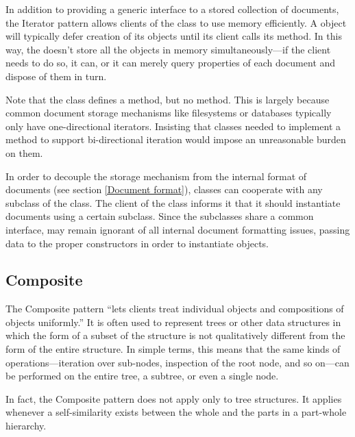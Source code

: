 In addition to providing a generic interface to a stored collection of
documents, the Iterator pattern allows clients of the  class
to use memory efficiently.  A  object will typically defer
creation of its  objects until its client calls its
 method.  In this way, the  doesn't store all
the  objects in memory simultaneously---if the client needs to do so,
it can, or it can merely query properties of each document and dispose
of them in turn.

Note that the  class defines a  method,
but no  method.  This is largely because common
document storage mechanisms like filesystems or databases typically
only have one-directional iterators.  Insisting that
 classes needed to implement a 
method to support bi-directional iteration would impose an
unreasonable burden on them.

In order to decouple the storage mechanism from the internal format of
documents (see section \ref{Document format}), 
classes can cooperate with any subclass of the  class.
The client of the  class informs it that it should
instantiate documents using a certain  subclass.
Since the  subclasses share a common interface, 
may remain ignorant of all internal document formatting issues,
passing data to the proper constructors in order to instantiate
 objects.


\subsection{Composite}

The Composite pattern ``lets clients treat individual objects and
compositions of objects uniformly.'' \cite[p. 163]{gamma:95} It is
often used to represent trees or other data structures in which the
form of a subset of the structure is not qualitatively different from
the form of the entire structure.  In simple terms, this means that
the same kinds of operations---iteration over sub-nodes, inspection of
the root node, and so on---can be performed on the entire tree, a
subtree, or even a single node.

In fact, the Composite pattern does not apply only to tree
structures.  It applies whenever a self-similarity exists between the
whole and the parts in a part-whole hierarchy.

